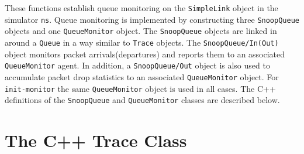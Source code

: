 These functions establish queue monitoring on the {\tt SimpleLink} object
in the simulator {\tt ns}.
Queue monitoring is implemented by constructing three {\tt SnoopQueue}
objects and one {\tt QueueMonitor} object.
The {\tt SnoopQueue} objects are linked in around a {\tt Queue} in a way
similar to {\tt Trace} objects.
The {\tt SnoopQueue/In(Out)} object monitors packet arrivals(departures)
and reports them to an associated {\tt QueueMonitor} agent.
In addition, a {\tt SnoopQueue/Out} object is also used to accumulate
packet drop statistics to an associated {\tt QueueMonitor} object.
For {\tt init-monitor} the same {\tt QueueMonitor} object is used
in all cases.
The C++ definitions of the {\tt SnoopQueue} and {\tt QueueMonitor}
classes are described below.

\section{The C++ Trace Class}
\label{sec:tracemoncplus}

